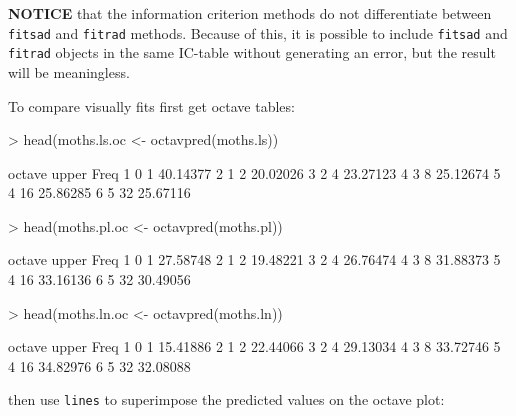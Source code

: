 \documentclass[11pt, A4]{article}
\newcommand{\code}[1]{\texttt{#1}}
\begin{document}
\textbf{NOTICE} that the information criterion methods do not differentiate between
\code{fitsad} and \code{fitrad} methods. Because of this, it is possible to include
\code{fitsad} and \code{fitrad} objects in the same IC-table without generating an error,
but the result will be meaningless.

To compare visually fits first get octave tables:

\begin{Schunk}
\begin{Sinput}
> head(moths.ls.oc <- octavpred(moths.ls))
\end{Sinput}
\begin{Soutput}
  octave upper     Freq
1      0     1 40.14377
2      1     2 20.02026
3      2     4 23.27123
4      3     8 25.12674
5      4    16 25.86285
6      5    32 25.67116
\end{Soutput}
\begin{Sinput}
> head(moths.pl.oc <- octavpred(moths.pl))
\end{Sinput}
\begin{Soutput}
  octave upper     Freq
1      0     1 27.58748
2      1     2 19.48221
3      2     4 26.76474
4      3     8 31.88373
5      4    16 33.16136
6      5    32 30.49056
\end{Soutput}
\begin{Sinput}
> head(moths.ln.oc <- octavpred(moths.ln))
\end{Sinput}
\begin{Soutput}
  octave upper     Freq
1      0     1 15.41886
2      1     2 22.44066
3      2     4 29.13034
4      3     8 33.72746
5      4    16 34.82976
6      5    32 32.08088
\end{Soutput}
\end{Schunk}

then use \code{lines} to superimpose the predicted values on the octave plot:
\end{document}
